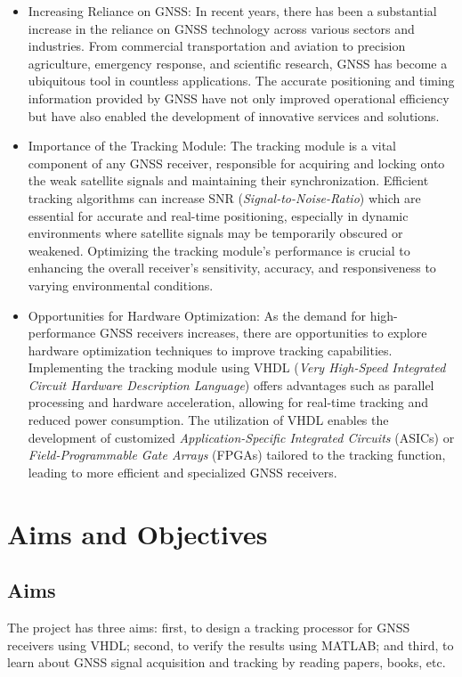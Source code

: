\begin{itemize}
    \item Increasing Reliance on GNSS: In recent years, there has been a substantial increase in the reliance on GNSS technology across various sectors and industries. From commercial transportation and aviation to precision agriculture, emergency response, and scientific research, GNSS has become a ubiquitous tool in countless applications. The accurate positioning and timing information provided by GNSS have not only improved operational efficiency but have also enabled the development of innovative services and solutions.
    \item Importance of the Tracking Module: The tracking module is a vital component of any GNSS receiver, responsible for acquiring and locking onto the weak satellite signals and maintaining their synchronization. Efficient tracking algorithms can increase SNR (\textit{Signal-to-Noise-Ratio}) which are essential for accurate and real-time positioning, especially in dynamic environments where satellite signals may be temporarily obscured or weakened. Optimizing the tracking module's performance is crucial to enhancing the overall receiver's sensitivity, accuracy, and responsiveness to varying environmental conditions.
    \item Opportunities for Hardware Optimization: As the demand for high-performance GNSS receivers increases, there are opportunities to explore hardware optimization techniques to improve tracking capabilities. Implementing the tracking module using VHDL (\textit{Very High-Speed Integrated Circuit Hardware Description Language}) offers advantages such as parallel processing and hardware acceleration, allowing for real-time tracking and reduced power consumption. The utilization of VHDL enables the development of customized \textit{Application-Specific Integrated Circuits} (ASICs) or \textit{Field-Programmable Gate Arrays} (FPGAs) tailored to the tracking function, leading to more efficient and specialized GNSS receivers.
\end{itemize}

\section{Aims and Objectives}
\subsection{Aims}
The project has three aims: first, to design a tracking processor for GNSS receivers using VHDL; second, to verify the results using MATLAB; and third, to learn about GNSS signal acquisition and tracking by reading papers, books, etc.

